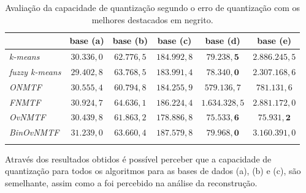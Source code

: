 \documentclass[
    12pt,                %
    oneside,            %
    a4paper,            %
    english,            %
    brazil                %
    ]{abntex2ppgsi}
\begin{document}
\begin{table}[H]
\centering
    \caption{Avaliação da capacidade de quantização segundo o erro de quantização com os melhores destacados em negrito.}
        \begin{tabular}{lccccc}
            \hline
            & \textbf{base (a)} & \textbf{base (b)} & \textbf{base (c)} & \textbf{base (d)} & \textbf{base (e)} \\
            \hline
            \textit{k-means}        & $30.336,0$ & $62.776,5$ & $184.992,8$ & $\mathbf{79.238,5}$  & $2.886.245,5$        \\

            \textit{fuzzy k-means}  & $29.402,8$ & $63.768,5$ & $183.991,4$ & $\mathbf{78.340,0}$  & $2.307.168,6$        \\


            \textit{ONMTF}          & $30.555,4$ & $60.794,8$ & $184.255,9$ & $579.136,7$          & $781.131,6$          \\

            \textit{FNMTF}          & $30.924,7$ & $64.636,1$ & $186.224,4$ & $1.634.328,5$        & $2.881.172,0$        \\

            \textit{OvNMTF}         & $30.439,8$ & $61.863,2$ & $178.886,8$ & $\mathbf{75.533,6}$  & $\mathbf{75.931,2}$  \\

            \textit{BinOvNMTF}      & $31.239,0$ & $63.660,4$ & $187.579,8$ & $\mathbf{79.968,0}$  & $3.160.391,0$        \\
            \hline \\
        \end{tabular}
        \label{tab:quantization}
\end{table}

Através dos resultados obtidos é possível perceber que a capacidade de quantização para todos os algoritmos para as bases de dados (a), (b) e (c), são semelhante, assim como a foi percebido na análise da reconstrução.
\end{document}
